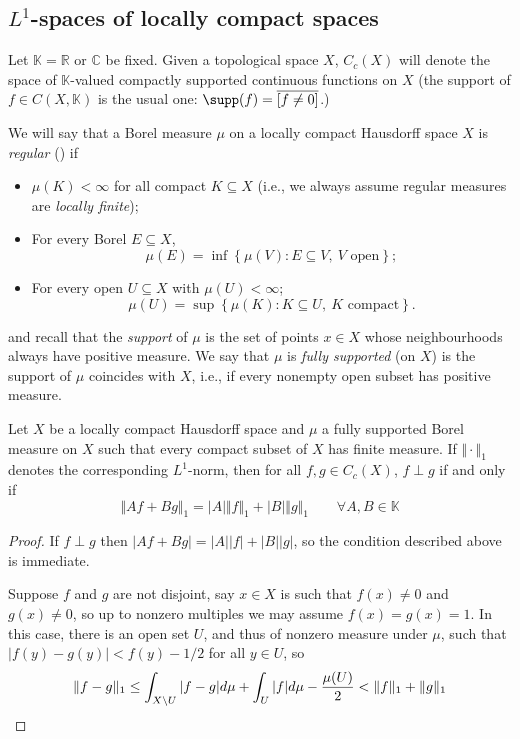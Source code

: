 
\subsection{$L^1$-spaces of locally compact spaces}\label{subsectionl1spaces}

Let $\mathbb{K}=\mathbb{R}$ or $\mathbb{C}$ be fixed. Given a topological space $X$, $C_c(X)$ will denote the space of $\mathbb{K}$-valued compactly supported continuous functions on $X$ (the support of $f\in C(X,\mathbb{K})$ is the usual one: $\supp(f)=\overline{[f\neq 0]}$.)

We will say that a Borel measure $\mu$ on a locally compact Hausdorff space $X$ is \emph{regular} (\cite{MR924157}) if
\begin{itemize}
\item $\mu(K)<\infty$ for all compact $K\subseteq X$ (i.e., we always assume regular measures are \emph{locally finite});
\item For every Borel $E\subseteq X$,
\[\mu(E)=\inf\left\{\mu(V):E\subseteq V,\ V\text{ open}\right\};\]
\item For every open $U\subseteq X$ with $\mu(U)<\infty$;
\[\mu(U)=\sup\left\{\mu(K):K\subseteq U,\ K\text{ compact}\right\}.\]
\end{itemize}
and recall that the \emph{support} of $\mu$ is the set of points $x\in X$ whose neighbourhoods always have positive measure. We say that $\mu$ is \emph{fully supported} (on $X$) is the support of $\mu$ coincides with $X$, i.e., if every nonempty open subset has positive measure.

\begin{lemma}\label{lemmadisjointnessl1}
Let $X$ be a locally compact Hausdorff space and $\mu$ a fully supported Borel measure on $X$ such that every compact subset of $X$ has finite measure. If $\Vert\cdot\Vert_1$ denotes the corresponding $L^1$-norm, then for all $f,g\in C_c(X)$, $f\perp g$ if and only if
\[\Vert Af+Bg\Vert_1=|A|\Vert f\Vert_1+|B|\Vert g\Vert_1\qquad\forall A,B\in\mathbb{K}\]
\end{lemma}
\begin{proof}
If $f\perp g$ then $|Af+Bg|=|A||f|+|B||g|$, so the condition described above is immediate.

Suppose $f$ and $g$ are not disjoint, say $x\in X$ is such that $f(x)\neq 0$ and $g(x)\neq 0$, so up to nonzero multiples we may assume $f(x)=g(x)=1$. In this case, there is an open set $U$, and thus of nonzero measure under $\mu$, such that $|f(y)-g(y)|<f(y)-1/2$ for all $y\in U$, so
\[\Vert f-g\Vert_1\leq\int_{X\setminus U}|f-g|d\mu+\int_U|f|d\mu-\dfrac{\mu(U)}{2}<\Vert f\Vert_1+\Vert g\Vert_1\qedhere\]
\end{proof}

